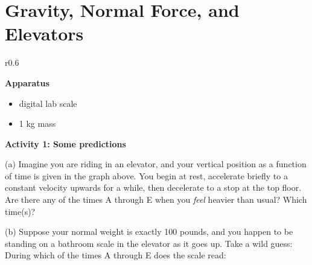 \section{Gravity, Normal Force, and Elevators}


\makelabheader %

\begin{wrapfigure}[4]{r}{0.6\textwidth}
\end{wrapfigure}

\medskip
\bigskip
\textbf{Apparatus}

\begin{itemize}[nosep]
\item digital lab scale
\item 1 kg mass
\end{itemize}

\medskip
\bigskip
\textbf{Activity 1: Some predictions}

(a) Imagine you are riding in an elevator, and your vertical position as a function of time is given in the graph above.  You begin at rest, accelerate briefly to a constant velocity upwards for a while, then decelerate to a stop at the top floor.  Are there any of the times A through E when you \textit{feel} heavier than usual?  Which time(s)?
\answerspace{0.4in}


(b) Suppose your normal weight is exactly 100 pounds, and you happen to be standing on a bathroom scale in the elevator as it goes up.  Take a wild guess: During which of the times A through E does the scale read:

